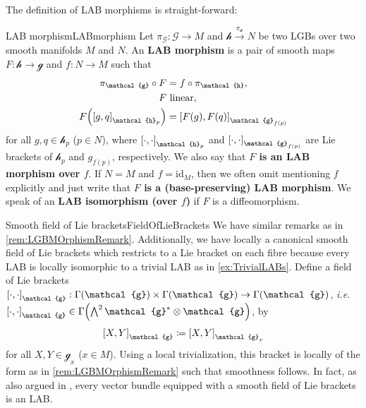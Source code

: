 \documentclass[reqno,a4paper,oneside]{amsart}
\theoremstyle{plain}
\theoremstyle{remark}
\theoremstyle{definition}
\begin{document}
The definition of LAB morphisms is straight-forward:

\begin{definitions}{LAB morphism}{LABmorphism}
Let $\pi_{\mathcal{G}} \colon \mathcal{G} \to M$ and $\mathcal{h} \stackrel{\pi_{\mathcal{h}}}{\to} N$ be two LGBs over two smooth manifolds $M$ and $N$. An \textbf{LAB morphism} is a pair of smooth maps $F \colon \mathcal{h} \to \mathcal{g}$ and $f \colon N \to M$ such that
\begin{align*}
\pi_{\mathcal{g}} \circ F &= f \circ \pi_{\mathcal{h}},\\
F &\text{ linear},\\
F\mleft(\mleft[g, q\mright]_{\mathcal{h}_p}\mright) &= \mleft[F(g), F(q)\mright]_{\mathcal{g}_{f(p)}}
\end{align*}
for all $g, q \in \mathcal{h}_p$ ($p \in N$), where $\mleft[\cdot, \cdot\mright]_{\mathcal{h}_p}$ and $\mleft[\cdot, \cdot\mright]_{\mathcal{g}_{f(p)}}$ are Lie brackets of $\mathcal{h}_p$ and $g_{f(p)}$, respectively. We also say that \textbf{$F$ is an LAB morphism over $f$}. If $N = M$ and $f = \mathrm{id}_M$, then we often omit mentioning $f$ explicitly and just write that \textbf{$F$ is a (base-preserving) LAB morphism}. We speak of an \textbf{LAB isomorphism (over $f$)} if $F$ is a diffeomorphism.
\end{definitions}

\begin{remarks}{Smooth field of Lie brackets}{FieldOfLieBrackets}
We have similar remarks as in \ref{rem:LGBMOrphismRemark}. Additionally, we have locally a canonical smooth field of Lie brackets which restricts to a Lie bracket on each fibre because every LAB is locally isomorphic to a trivial LAB as in \ref{ex:TrivialLABs}. Define a field of Lie brackets $\mleft[ \cdot, \cdot \mright]_{\mathcal{g}}: \Gamma(\mathcal{g}) \times \Gamma(\mathcal{g}) \to \Gamma(\mathcal{g})$, \textit{i.e.}\ $\mleft[ \cdot, \cdot \mright]_{\mathcal{g}} \in \Gamma\mleft(\bigwedge^2 \mathcal{g}^* \otimes \mathcal{g} \mright)$, by
\begin{equation*}
\mleft[ X, Y \mright]_{\mathcal{g}}
\coloneqq
\mleft[ X, Y \mright]_{\mathcal{g}_x}
\end{equation*}
for all $X, Y \in \mathcal{g}_x$ ($x \in M$). Using a local trivialization, this bracket is locally of the form as in \ref{rem:LGBMOrphismRemark} such that smoothness follows. In fact, as also argued in \cite[\S 16.2, Example 2, page 114]{DaSilva}, every vector bundle equipped with a smooth field of Lie brackets is an LAB.
\end{remarks}
\end{document}
